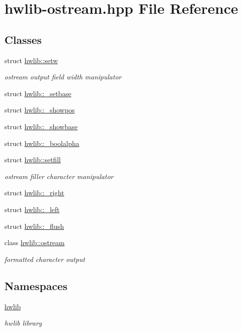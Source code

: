 \hypertarget{hwlib-ostream_8hpp}{}\section{hwlib-\/ostream.hpp File Reference}
\label{hwlib-ostream_8hpp}
\subsection*{Classes}
\begin{DoxyCompactItemize}
\item 
struct \hyperlink{structhwlib_1_1setw}{hwlib\+::setw}
\begin{DoxyCompactList}\small\item\em ostream output field width manipulator \end{DoxyCompactList}\item 
struct \hyperlink{structhwlib_1_1__setbase}{hwlib\+::\+\_\+setbase}
\item 
struct \hyperlink{structhwlib_1_1__showpos}{hwlib\+::\+\_\+showpos}
\item 
struct \hyperlink{structhwlib_1_1__showbase}{hwlib\+::\+\_\+showbase}
\item 
struct \hyperlink{structhwlib_1_1__boolalpha}{hwlib\+::\+\_\+boolalpha}
\item 
struct \hyperlink{structhwlib_1_1setfill}{hwlib\+::setfill}
\begin{DoxyCompactList}\small\item\em ostream filler character manipulator \end{DoxyCompactList}\item 
struct \hyperlink{structhwlib_1_1__right}{hwlib\+::\+\_\+right}
\item 
struct \hyperlink{structhwlib_1_1__left}{hwlib\+::\+\_\+left}
\item 
struct \hyperlink{structhwlib_1_1__flush}{hwlib\+::\+\_\+flush}
\item 
class \hyperlink{classhwlib_1_1ostream}{hwlib\+::ostream}
\begin{DoxyCompactList}\small\item\em formatted character output \end{DoxyCompactList}\end{DoxyCompactItemize}
\subsection*{Namespaces}
\begin{DoxyCompactItemize}
\item 
 \hyperlink{namespacehwlib}{hwlib}
\begin{DoxyCompactList}\small\item\em hwlib library \end{DoxyCompactList}\end{DoxyCompactItemize}
